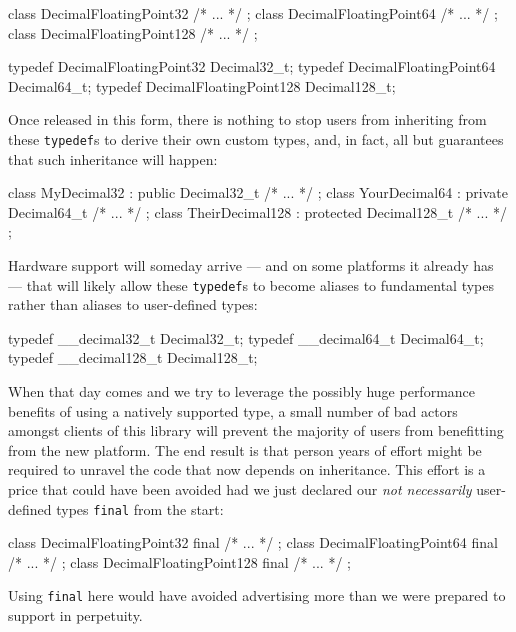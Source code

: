 {{\begin{emcppslisting}
class DecimalFloatingPoint32  { /* ... */ };
class DecimalFloatingPoint64  { /* ... */ };
class DecimalFloatingPoint128 { /* ... */ };

typedef DecimalFloatingPoint32  Decimal32_t;
typedef DecimalFloatingPoint64  Decimal64_t;
typedef DecimalFloatingPoint128 Decimal128_t;
\end{emcppslisting}
    

\noindent Once released in this form, there is nothing to stop users from
inheriting from these \lstinline!typedef!s to derive their own custom
types, and, in fact,  all but guarantees that such
inheritance will happen:

\begin{emcppslisting}
class MyDecimal32     : public Decimal32_t     { /* ... */ };
class YourDecimal64   : private Decimal64_t    { /* ... */ };
class TheirDecimal128 : protected Decimal128_t { /* ... */ };
\end{emcppslisting}
    

\noindent Hardware support will someday arrive --- and on some platforms it
already has --- that will likely allow these \lstinline!typedef!s to become
aliases to fundamental types rather than aliases to user-defined types:

\begin{emcppslisting}
typedef __decimal32_t  Decimal32_t;
typedef __decimal64_t  Decimal64_t;
typedef __decimal128_t Decimal128_t;
\end{emcppslisting}
    

\noindent When that day comes and we try to leverage the possibly huge performance
benefits of using a natively supported type, a small number of bad
actors amongst clients of this library will prevent the majority of
users from benefitting from the new platform. The end result is that
person years of effort might be required to unravel the code that now
depends on inheritance. This effort is a price that could have been
avoided had we just declared our \emph{not necessarily} user-defined
types \lstinline!final! from the start:

\begin{emcppslisting}
class DecimalFloatingPoint32 final  { /* ... */ };
class DecimalFloatingPoint64 final  { /* ... */ };
class DecimalFloatingPoint128 final { /* ... */ };
\end{emcppslisting}
    

\noindent Using \lstinline!final! here would have avoided advertising more than we
were prepared to support in perpetuity.

}}
